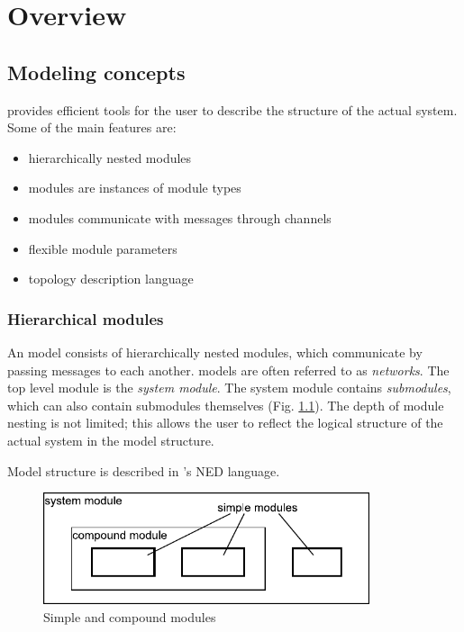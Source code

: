 \chapter{Overview}
\label{cha:overview}


\section{Modeling concepts}

{\opp} provides efficient tools for the user to describe the
structure of the actual system. Some of the main features are:
\begin{itemize}
\item{hierarchically nested modules}
\item{modules are instances of module types}
\item{modules communicate with messages through channels}
\item{flexible module parameters}
\item{topology description language}
\end{itemize}

\subsection{Hierarchical modules}


An {\opp} model consists of hierarchically nested
modules, which communicate by passing 
messages to each another.
{\opp} models are often referred to as \textit{networks}. The top
level module is the \textit{system module}.  The system module
contains \textit{submodules}, which can also contain submodules
themselves (Fig. \ref{fig:ch-overview:modules}). The depth of module
nesting is not limited; this allows the user to reflect the logical
structure of the actual system in the model structure.

Model structure is described in {\opp}'s NED language.

\begin{figure}[htbp]
\begin{center}
\includegraphics[width=3.772in, height=1.292in]{figures/usmanFig2}
\caption{Simple and compound modules}
\label{fig:ch-overview:modules}
\end{center}
\end{figure}


